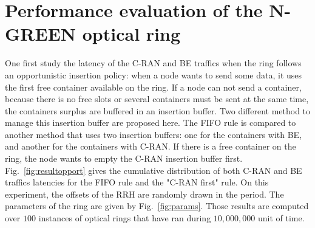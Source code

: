 \documentclass[]{algotel}
\begin{document}
  
   \section{Performance evaluation of the N-GREEN optical ring}
   \label{sec:oportmethods}
  One first study the latency of the C-RAN and BE traffics when the ring follows an opportunistic insertion policy: when a node wants to send some data, it uses the first free container available on the ring. If a node can not send a container, because there is no free slots or several containers must be sent at the same time, the containers surplus are buffered in an insertion buffer.
  Two different method to manage this insertion buffer are proposed here. The FIFO rule is compared to another method that uses two insertion buffers: one for the containers with BE, and another for the containers with C-RAN. If there is a free container on the ring, the node wants to empty the C-RAN insertion buffer first.
  Fig.~\ref{fig:resultopport} gives the cumulative distribution of both C-RAN and BE traffics latencies for the FIFO rule and the "C-RAN first" rule. On this experiment, the offsets of the RRH are randomly drawn in the period. The parameters of the ring are given by Fig.~\ref{fig:params}. Those results are computed over $100$ instances of optical rings that have ran during $10,000,000$ unit of time.
  
\end{document}
